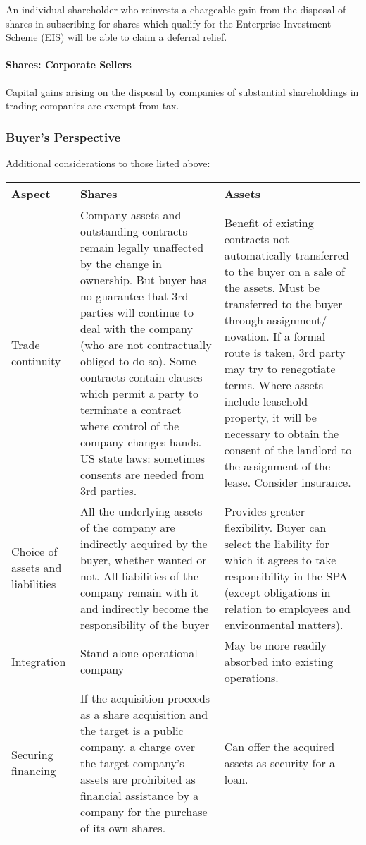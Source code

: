 \documentclass[
]{article}
\begin{document}
An individual shareholder who reinvests a chargeable gain from the
disposal of shares in subscribing for shares which qualify for the
Enterprise Investment Scheme (EIS) will be able to claim a deferral
relief.

\hypertarget{shares-corporate-sellers}{%
\paragraph{Shares: Corporate Sellers}\label{shares-corporate-sellers}}

Capital gains arising on the disposal by companies of substantial
shareholdings in trading companies are exempt from tax.

\hypertarget{buyers-perspective}{%
\subsubsection{Buyer's Perspective}\label{buyers-perspective}}

Additional considerations to those listed above:

\begin{longtable}[]{@{}lll@{}}
\toprule()
Aspect & Shares & Assets \\
\midrule()
\endhead
Trade continuity & Company assets and outstanding contracts remain
legally unaffected by the change in ownership. But buyer has no
guarantee that 3rd parties will continue to deal with the company (who
are not contractually obliged to do so). Some contracts contain clauses
which permit a party to terminate a contract where control of the
company changes hands. US state laws: sometimes consents are needed from
3rd parties. & Benefit of existing contracts not automatically
transferred to the buyer on a sale of the assets. Must be transferred to
the buyer through assignment/ novation. If a formal route is taken, 3rd
party may try to renegotiate terms. Where assets include leasehold
property, it will be necessary to obtain the consent of the landlord to
the assignment of the lease. Consider insurance. \\
Choice of assets and liabilities & All the underlying assets of the
company are indirectly acquired by the buyer, whether wanted or not. All
liabilities of the company remain with it and indirectly become the
responsibility of the buyer & Provides greater flexibility. Buyer can
select the liability for which it agrees to take responsibility in the
SPA (except obligations in relation to employees and environmental
matters). \\
Integration & Stand-alone operational company & May be more readily
absorbed into existing operations. \\
Securing financing & If the acquisition proceeds as a share acquisition
and the target is a public company, a charge over the target company's
assets are prohibited as financial assistance by a company for the
purchase of its own shares. & Can offer the acquired assets as security
for a loan. \\
\bottomrule()
\end{longtable}
\end{document}
